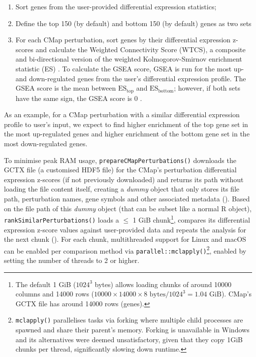 \begin{enumerate}
	\item Sort genes from the user-provided differential expression statistics;
	\item Define the top 150 (by default) and bottom 150 (by default) genes as two sets
	\item For each CMap perturbation, sort genes by their differential expression z-scores and calculate the Weighted Connectivity Score (WTCS), a composite and bi-directional version of the weighted Kolmogorov-Smirnov enrichment statistic (ES) \cite{subramanian:2017ul}. To calculate the GSEA score, GSEA is run for the most up- and down-regulated genes from the user’s differential expression profile. The GSEA score is the mean between $\textrm{ES}_{\textrm{top}}$ and $\textrm{ES}_{\textrm{bottom}}$; however, if both sets have the same sign, the GSEA score is 0 \cite{subramanian:2017ul}.
\end{enumerate}

As an example, for a CMap perturbation with a similar differential expression profile to user’s input, we expect to find higher enrichment of the top gene set in the most up-regulated genes and higher enrichment of the bottom gene set in the most down-regulated genes.

To minimise peak RAM usage, \texttt{prepareCMapPerturbations()} downloads the GCTX file (a customised HDF5 file) for the CMap’s perturbation differential expression z-scores (if not previously downloaded) and returns its path without loading the file content itself, creating a \emph{dummy} object that only stores its file path, perturbation names, gene symbols and other associated metadata (). Based on the file path of this \emph{dummy} object (that can be subset like a normal R object), \texttt{rankSimilarPerturbations()} loads a $\le$ 1 GiB chunk\footnote{The default 1 GiB ($1024^3$ bytes) allows loading chunks of around 10000 columns and 14000 rows ($10000 \times 14000 \times 8 \textrm{ bytes} / 1024^3 = 1.04 \textrm{ GiB}$). CMap's GCTX file has around 14000 rows (genes).}, compares its differential expression z-score values against user-provided data and repeats the analysis for the next chunk (). For each chunk, multithreaded support for Linux and macOS can be enabled per comparison method via \texttt{parallel::mclapply()}\footnote{\texttt{mclapply()} parallelises tasks via forking where multiple child processes are spawned and share their parent's memory. Forking is unavailable in Windows and its alternatives were deemed unsatisfactory, given that they copy 1GiB chunks per thread, significantly slowing down runtime.}, enabled by setting the number of threads to 2 or higher.

